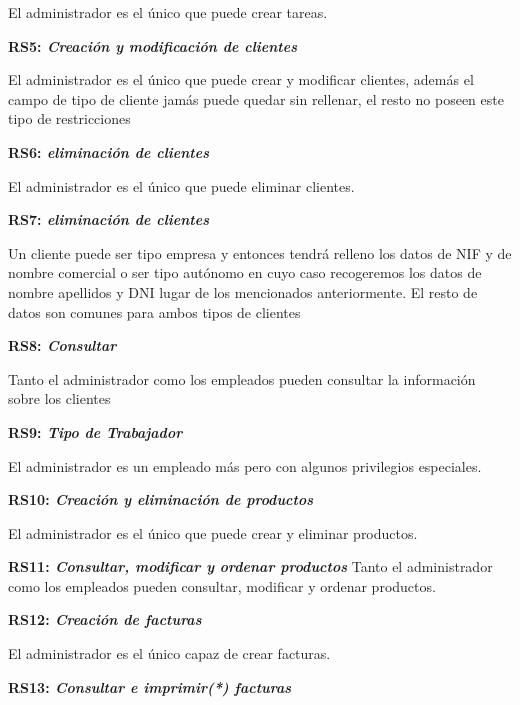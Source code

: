 \documentclass[paper=a4, fontsize=11pt, spanish]{scrartcl}
\begin{document}
El administrador es el único que puede crear tareas.

\setlength{\parindent}{0em}
\textbf{RS5: \textit{Creación y modificación de clientes}}
\setlength{\parindent}{2em}

El administrador es el único que puede crear y modificar clientes, además el campo de tipo de cliente jamás puede quedar sin rellenar, el resto no poseen este tipo de restricciones


\setlength{\parindent}{0em}
\textbf{RS6: \textit{eliminación de clientes}}
\setlength{\parindent}{2em}

El administrador es el único que puede eliminar clientes.

\setlength{\parindent}{0em}
\textbf{RS7: \textit{eliminación de clientes}}
\setlength{\parindent}{2em}

Un cliente puede ser tipo empresa y entonces tendrá relleno los datos de NIF y de nombre comercial o ser tipo autónomo en cuyo caso recogeremos los datos de nombre apellidos y DNI lugar de los mencionados anteriormente. El resto de datos son comunes para ambos tipos de clientes


\setlength{\parindent}{0em}
\textbf{RS8: \textit{Consultar}}
\setlength{\parindent}{2em}

Tanto el administrador como los empleados pueden consultar la información sobre los clientes


\setlength{\parindent}{0em}
\textbf{RS9: \textit{Tipo de Trabajador}}
\setlength{\parindent}{2em}

El administrador es un empleado más pero con algunos privilegios especiales.

\setlength{\parindent}{0em}
\textbf{RS10: \textit{Creación y eliminación de productos}}
\setlength{\parindent}{2em}

El administrador es el único que puede crear y eliminar productos.

\setlength{\parindent}{0em}
\textbf{RS11: \textit{Consultar, modificar y ordenar productos}}
\setlength{\parindent}{2em}
Tanto el administrador como los empleados pueden consultar, modificar y ordenar productos.

\setlength{\parindent}{0em}
\textbf{RS12: \textit{Creación de facturas}}
\setlength{\parindent}{2em}

El administrador es el único capaz de crear facturas.


\setlength{\parindent}{0em}
\textbf{RS13: \textit{Consultar e imprimir(*) facturas}}
\setlength{\parindent}{2em}
\end{document}
